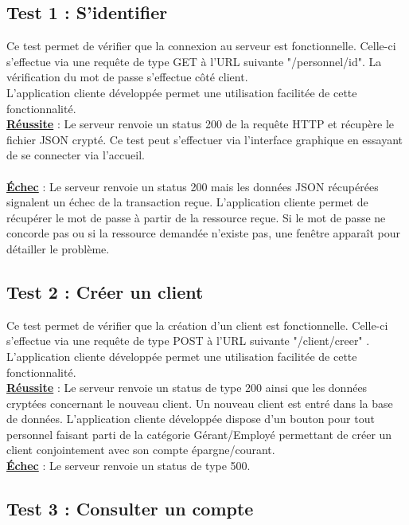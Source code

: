 \subsection{Test 1 : S'identifier}

Ce test permet de vérifier que la connexion au serveur est fonctionnelle.
Celle-ci s'effectue via une requête de type GET à l'URL suivante "/personnel/{id}".
La vérification du mot de passe s'effectue côté client. 
\\
L'application cliente développée permet une utilisation facilitée de cette fonctionnalité. 
\\
\textbf{\underline{Réussite}} : Le serveur renvoie un status 200 de la requête HTTP et récupère le fichier JSON crypté. Ce test peut s'effectuer via l'interface graphique en essayant de se connecter via l'accueil.\\
\\
\textbf{\underline{Échec}} : Le serveur renvoie un status 200 mais les données JSON récupérées signalent un échec de la transaction reçue.
L'application cliente permet de récupérer le mot de passe à partir de la ressource reçue. Si le mot de passe ne concorde pas ou si la ressource demandée n'existe pas, une fenêtre apparaît pour détailler le problème.

\subsection{Test 2 : Créer un client}

Ce test permet de vérifier que la création d'un client est fonctionnelle.
Celle-ci s'effectue via une requête de type POST à l'URL suivante "/client/creer" .
\\
L'application cliente développée permet une utilisation facilitée de cette fonctionnalité. 
\\
\textbf{\underline{Réussite}} : Le serveur renvoie un status de type 200 ainsi que les données cryptées concernant le nouveau client. Un nouveau client est entré dans la base de données.
L'application cliente développée dispose d'un bouton pour tout personnel faisant parti de la catégorie Gérant/Employé permettant de créer un client conjointement avec son compte épargne/courant.
\\
\textbf{\underline{Échec}} : Le serveur renvoie un status de type 500.

\subsection{Test 3 : Consulter un compte}

